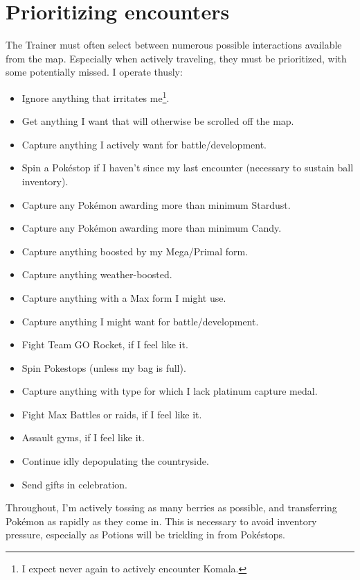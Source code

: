 \section{Prioritizing encounters}
\label{sec:prioritymap}
The Trainer must often select between numerous possible interactions available from the map.
Especially when actively traveling, they must be prioritized, with some potentially missed.
I operate thusly:
\begin{itemize}
\item Ignore anything that irritates me\footnote{I expect never again to actively encounter Komala.}.
\item Get anything I want that will otherwise be scrolled off the map.
\item Capture anything I actively want for battle/development.
\item Spin a Pokéstop if I haven't since my last encounter (necessary to sustain ball inventory).
\item Capture any Pokémon awarding more than minimum Stardust.
\item Capture any Pokémon awarding more than minimum Candy.
\item Capture anything boosted by my Mega/Primal form.
\item Capture anything weather-boosted.
\item Capture anything with a Max form I might use.
\item Capture anything I might want for battle/development.
\item Fight Team GO Rocket, if I feel like it.
\item Spin Pokestops (unless my bag is full).
\item Capture anything with type for which I lack platinum capture medal.
\item Fight Max Battles or raids, if I feel like it.
\item Assault gyms, if I feel like it.
\item Continue idly depopulating the countryside.
\item Send gifts in celebration.
\end{itemize}
Throughout, I'm actively tossing as many berries as possible, and
 transferring Pokémon as rapidly as they come in.
This is necessary to avoid inventory pressure, especially as
 Potions will be trickling in from Pokéstops.
